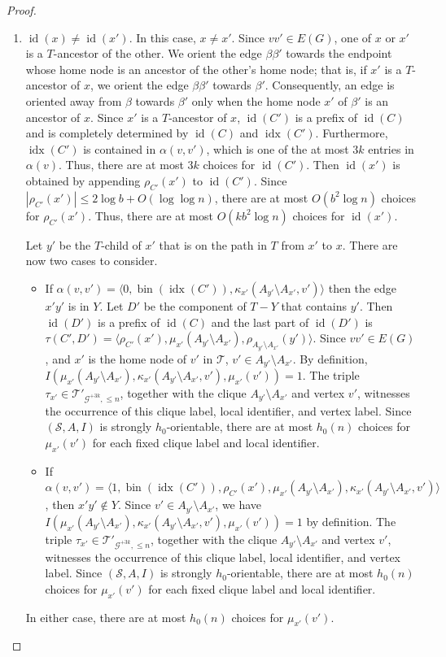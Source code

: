 \documentclass{patmorin}
\renewcommand{\le}{\leqslant}
\DeclareMathOperator{\id}{id}
\DeclareMathOperator{\bin}{bin}
\DeclareMathOperator{\idx}{idx}
\newcommand{\Oh}{O}
\newcommand{\calG}{\mathcal{G}}
\newcommand{\calS}{\mathcal{S}}
\newcommand{\calT}{\mathcal{T}}
\begin{document}
\begin{proof}
\begin{enumerate}
    \item $\id(x)\neq\id(x')$.  In this case, $x\neq x'$.  Since $vv'\in E(G)$, one of $x$ or $x'$ is a $T$-ancestor of the other.  We orient the edge $\beta\beta'$ towards the endpoint whose home node is an ancestor of the other's home node; that is, if $x'$ is a $T$-ancestor of $x$, we orient the edge $\beta\beta'$ towards $\beta'$. Consequently, an edge is oriented away from $\beta$ towards $\beta'$ only when the home node $x'$ of $\beta'$ is an ancestor of $x$.  Since $x'$ is a $T$-ancestor of $x$, $\id(C')$ is a prefix of $\id(C)$ and is completely determined by $\id(C)$ and $\idx(C')$.  Furthermore, $\idx(C')$ is contained in $\alpha(v,v')$, which is one of the at most $3k$ entries in $\alpha(v)$.  Thus, there are at most $3k$ choices for $\id(C')$.  Then $\id(x')$ is obtained by appending $\rho_{C'}(x')$ to $\id(C')$. Since $|\rho_{C'}(x')|\le 2\log b + \Oh(\log\log n)$, there are at most $\Oh(b^2\log n)$ choices for $\rho_{C'}(x')$.  Thus, there are at most $\Oh(k b^2\log n)$ choices for $\id(x')$. 
    
    Let $y'$ be the $T$-child of $x'$ that is on the path in $T$ from $x'$ to $x$.  There are now two cases to consider.
    \begin{itemize}
      \item If $\alpha(v,v')=\langle 0,\bin(\idx(C')),\kappa_{x'}(A_{y'}\setminus A_{x'},v')\rangle$ then the edge $x'y'$ is in $Y$.  Let $D'$ be the component of $T-Y$ that contains $y'$.  Then $\id(D')$ is a prefix of $\id(C)$ and the last part of $\id(D')$ is $\tau(C',D')=\langle \rho_{C'}(x'),\mu_{x'}(A_{y'}\setminus A_{x'}),\rho_{A_{y'}\setminus A_{x'}}(y')\rangle$.  Since $vv'\in E(G)$, and $x'$ is the home node of $v'$ in $\calT$, $v'\in A_{y'}\setminus A_{x'}$. By definition,  $I(\mu_{x'}(A_{y'}\setminus A_{x'}),\kappa_{x'}(A_{y'}\setminus A_{x'},v'),\mu_{x'}(v'))=1$. 
      The triple $\tau_{x'}\in\calT'_{\calG^{+3k},\le n}$, together with the clique $A_{y'}\setminus A_{x'}$ and vertex $v'$, witnesses the occurrence of this clique label, local identifier, and vertex label. Since $(\calS,A,I)$ is strongly $h_0$-orientable, there are at most $h_0(n)$ choices for $\mu_{x'}(v')$ for each fixed clique label and local identifier.

      \item If $\alpha(v,v')=\langle 1, \bin(\idx(C')), \rho_{C'}(x'), \mu_{x'}(A_{y'}\setminus A_{x'}), \kappa_{x'}(A_{y'}\setminus A_{x'}, v')\rangle$, then $x'y'\notin Y$.  Since $v'\in A_{y'}\setminus A_{x'}$, we have $I(\mu_{x'}(A_{y'}\setminus A_{x'}),\kappa_{x'}(A_{y'}\setminus A_{x'},v'),\mu_{x'}(v'))=1$ by definition.  The triple $\tau_{x'}\in\calT'_{\calG^{+3k},\le n}$, together with the clique $A_{y'}\setminus A_{x'}$ and vertex $v'$, witnesses the occurrence of this clique label, local identifier, and vertex label. Since $(\calS,A,I)$ is strongly $h_0$-orientable, there are at most $h_0(n)$ choices for $\mu_{x'}(v')$ for each fixed clique label and local identifier.
    \end{itemize}
    In either case, there are at most $h_0(n)$ choices for $\mu_{x'}(v')$. 


\end{enumerate}
\end{proof}
\end{document}
